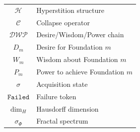 \documentclass[11pt,twoside]{book}
\newcommand{\HausdorffDim}{\dim_H}
\newcommand{\FractalSpectrum}{\sigma_\Phi}
\newcommand{\Failed}{\mathtt{Failed}}
\newcommand{\Hyperstition}{\mathcal{H}}
\newcommand{\Collapse}{\mathcal{C}}
\newcommand{\DWP}{\mathcal{DWP}}
\begin{document}
\begin{center}
\begin{longtable}{c|l}
$\Hyperstition$ & Hyperstition structure \\
$\Collapse$ & Collapse operator \\
$\DWP$ & Desire/Wisdom/Power chain \\
$D_m$ & Desire for Foundation $m$ \\
$W_m$ & Wisdom about Foundation $m$ \\
$P_m$ & Power to achieve Foundation $m$ \\
$\sigma$ & Acquisition state \\
$\Failed$ & Failure token \\
$\HausdorffDim$ & Hausdorff dimension \\
$\FractalSpectrum$ & Fractal spectrum \\
\end{longtable}
\end{center}

\end{document}
